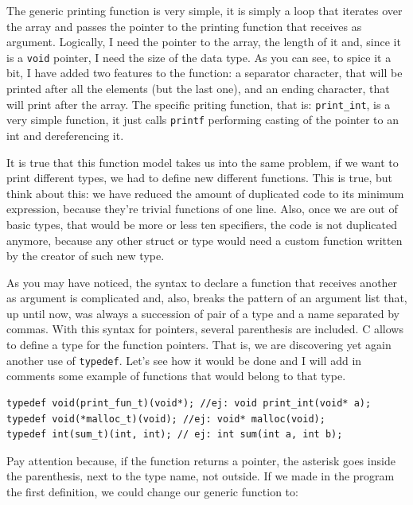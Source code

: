 \documentclass[a4paper]{article}
\begin{document}
The generic printing function is very simple, it is simply a loop that iterates
over the array and passes the pointer to the printing function that receives as
argument. Logically, I need the pointer to the array, the length of it and,
since it is a \verb!void! pointer, I need the size of the data type. As you can
see, to spice it a bit, I have added two features to the function: a
separator character, that will be printed after all the elements (but the last
one), and an ending character, that will print after the array. The specific
priting function, that is: \verb!print_int!, is a very simple
function, it just calls \verb!printf! performing casting of the pointer to an
int and dereferencing it.

It is true that this function model takes us into the same problem, if we want
to print different types, we had to define new different functions. This is
true, but think about this: we have reduced the amount of duplicated code to
its minimum expression, because they're trivial functions of one line. Also,
once we are out of basic types, that would be more or less ten specifiers, the
code is not duplicated anymore, because any other struct or type would need a
custom function written by the creator of such new type.

As you may have noticed, the syntax to declare a function that receives another
as argument is complicated and, also, breaks the pattern of an argument list
that, up until now, was always a succession of pair of a type and a name
separated by commas. With this syntax for pointers, several parenthesis
are included. C allows to define a type for the function pointers. That is,
we are discovering yet again another use of \verb!typedef!. Let's see how
it would be done and I will add in comments some example of functions that would
belong to that type.

\noindent
\begin{minipage}[H]{\linewidth}
\mbox{}
\begin{lstlisting}[style=C,
caption={Function pointer type definition},
label={lst:functionPointerTypedef}]
typedef void(print_fun_t)(void*); //ej: void print_int(void* a);
typedef void(*malloc_t)(void); //ej: void* malloc(void);
typedef int(sum_t)(int, int); // ej: int sum(int a, int b);
\end{lstlisting}
\end{minipage}

Pay attention because, if the function returns a pointer, the asterisk goes
inside the parenthesis, next to the type name, not outside. If we made in the
program the first definition, we could change our generic function to:
\end{document}
